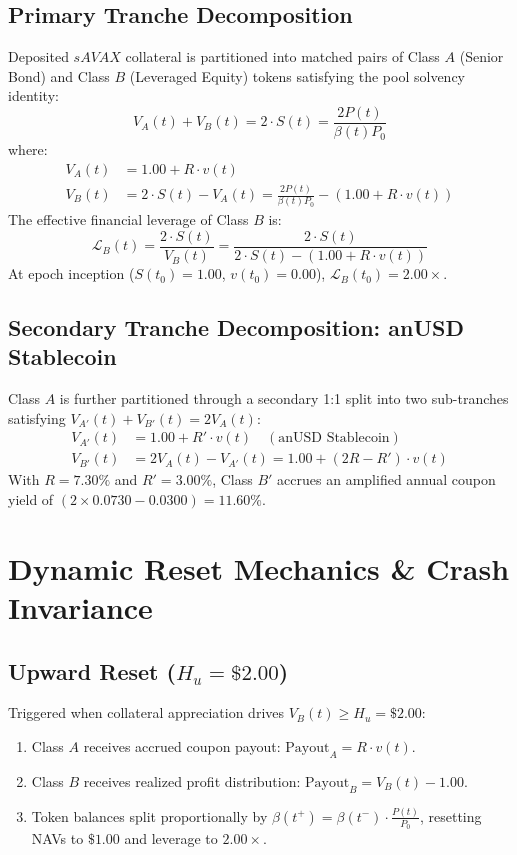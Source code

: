 \documentclass[10pt,journal,compsoc]{IEEEtran}
\begin{document}
\subsection{Primary Tranche Decomposition}
Deposited $sAVAX$ collateral is partitioned into matched pairs of Class $A$ (Senior Bond) and Class $B$ (Leveraged Equity) tokens satisfying the pool solvency identity:
\begin{equation}
V_A(t) + V_B(t) = 2 \cdot S(t) = \frac{2 P(t)}{\beta(t) P_0}
\end{equation}
where:
\begin{align}
V_A(t) &= 1.00 + R \cdot v(t) \\
V_B(t) &= 2 \cdot S(t) - V_A(t) = \frac{2 P(t)}{\beta(t) P_0} - (1.00 + R \cdot v(t))
\end{align}
The effective financial leverage of Class $B$ is:
\begin{equation}
\mathcal{L}_B(t) = \frac{2 \cdot S(t)}{V_B(t)} = \frac{2 \cdot S(t)}{2 \cdot S(t) - (1.00 + R \cdot v(t))}
\end{equation}
At epoch inception ($S(t_0) = 1.00$, $v(t_0) = 0.00$), $\mathcal{L}_B(t_0) = 2.00\times$.

\subsection{Secondary Tranche Decomposition: anUSD Stablecoin}
Class $A$ is further partitioned through a secondary 1:1 split into two sub-tranches satisfying $V_{A'}(t) + V_{B'}(t) = 2 V_A(t)$:
\begin{align}
V_{A'}(t) &= 1.00 + R' \cdot v(t) \quad (\text{anUSD Stablecoin}) \\
V_{B'}(t) &= 2 V_A(t) - V_{A'}(t) = 1.00 + (2R - R') \cdot v(t)
\end{align}
With $R = 7.30\%$ and $R' = 3.00\%$, Class $B'$ accrues an amplified annual coupon yield of $(2 \times 0.0730 - 0.0300) = 11.60\%$.

\section{Dynamic Reset Mechanics \& Crash Invariance}

\subsection{Upward Reset ($H_u = \$2.00$)}
Triggered when collateral appreciation drives $V_B(t) \ge H_u = \$2.00$:
\begin{enumerate}
    \item Class $A$ receives accrued coupon payout: $\text{Payout}_A = R \cdot v(t)$.
    \item Class $B$ receives realized profit distribution: $\text{Payout}_B = V_B(t) - 1.00$.
    \item Token balances split proportionally by $\beta(t^+) = \beta(t^-) \cdot \frac{P(t)}{P_0}$, resetting NAVs to $\$1.00$ and leverage to $2.00\times$.
\end{enumerate}
\end{document}
